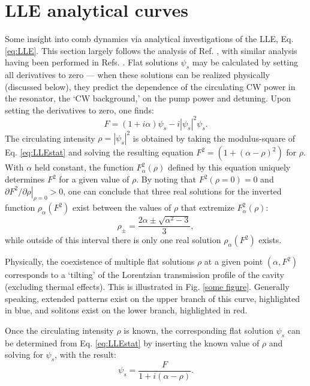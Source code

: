 \section{LLE analytical curves}
Some insight into comb dynamics via analytical investigations of the LLE, Eq. \ref{eq:LLE}. This section largely follows the analysis of Ref. \cite{Godey2014}, with similar analysis having been performed in Refs. \cite{others}. Flat solutions $\psi_s$ may be calculated by setting all derivatives to zero --- when these solutions can be realized physically (discussed below), they predict the dependence of the circulating CW power in the resonator, the `CW background,' on the pump power and detuning. Upon setting the derivatives to zero, one finds:
\begin{equation}
F=(1+i\alpha)\psi_s-i|\psi_s|^2\psi_s. \label{eq:LLEstat}
\end{equation}
The circulating intensity $\rho=|\psi_s|^2$ is obtained by taking the modulus-square of Eq. \ref{eq:LLEstat} and solving the resulting equation $F^2=\left(1+(\alpha-\rho)^2\right)$ for $\rho$. With $\alpha$ held constant, the function $F^2_\alpha(\rho)$ defined by this equation uniquely determines $F^2$ for a given value of $\rho$. By noting that $F^2(\rho=0)=0$ and $\left.\partial F^2/\partial \rho\right|_{\rho=0}>0$, one can conclude that three real solutions for the inverted function $\rho_\alpha(F^2)$ exist between the values of $\rho$ that extremize $F^2_\alpha(\rho)$:
\begin{equation}
\rho_\pm=\frac{2\alpha\pm\sqrt{\alpha^2-3}}{3},
\end{equation}
while outside of this interval there is only one real solution $\rho_\alpha(F^2)$ exists.

Physically, the coexistence of multiple flat solutions $\rho$ at a given point $(\alpha,F^2)$ corresponds to a `tilting' of the Lorentzian transmission profile of the cavity (excluding thermal effects). This is illustrated in Fig. \ref{some figure}. Generally speaking, extended patterns exist on the upper branch of this curve, highlighted in blue, and solitons exist on the lower branch, highlighted in red.

Once the circulating intensity $\rho$ is known, the corresponding flat solution $\psi_s$ can be determined from Eq. \ref{eq:LLEstat} by inserting the known value of $\rho$ and solving for $\psi_s$, with the result:
\begin{equation}
\psi_s=\frac{F}{1+i(\alpha-\rho)}.
\end{equation}

